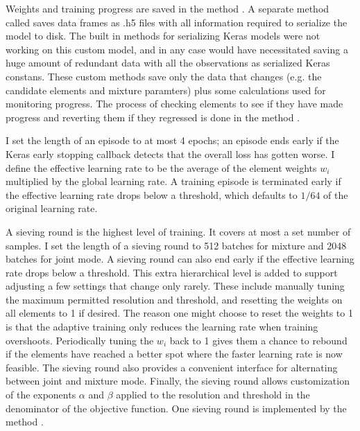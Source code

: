 Weights and training progress are saved in the method .
A separate method called  saves data frames as .h5 files with all information required to serialize the model to disk.
The built in methods for serializing Keras models were not working on this custom model, 
and in any case would have necessitated saving a huge amount of redundant data with all the observations as serialized Keras constans.
These custom methods save only the data that changes (e.g. the candidate elements and mixture paramters) plus some calculations used for monitoring progress.
The process of checking elements to see if they have made progress and reverting them if they regressed 
is done in the method .

I set the length of an episode to at most 4 epochs; an episode ends early if the Keras early stopping callback detects that the overall loss has gotten worse.
I define the effective learning rate to be the average of the element weights $w_i$ multiplied by the global learning rate.
A training episode is terminated early if the effective learning rate drops below a threshold, which defaults to $1/64$ of the original learning rate.

A sieving round is the highest level of training.
It covers at most a set number of samples.
I set the length of a sieving round to 512 batches for mixture and 2048 batches for joint mode.
A sieving round can also end early if the effective learning rate drops below a threshold.
This extra hierarchical level is added to support adjusting a few settings that change only rarely.
These include manually tuning the maximum permitted resolution and threshold, and resetting the weights on all elements to 1 if desired.
The reason one might choose to reset the weights to 1 is that the adaptive training only reduces the learning rate when training overshoots.
Periodically tuning the $w_i$ back to 1 gives them a chance to rebound if the elements have reached a better spot where the faster
learning rate is now feasible.
The sieving round also provides a convenient interface for alternating between joint and mixture mode.
Finally, the sieving round allows customization of the exponents $\alpha$ and $\beta$ applied to the resolution and threshold 
in the denominator of the objective function.
One sieving round is implemented by the method .

